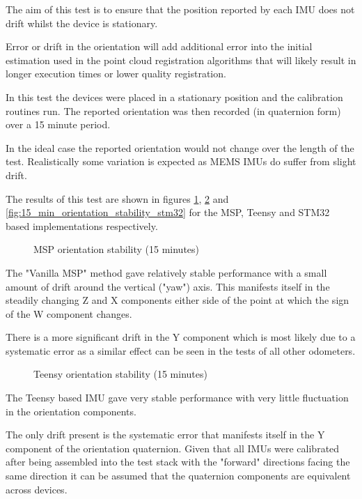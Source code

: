 \documentclass{entcs}
\begin{document}
The aim of this test is to ensure that the position reported by each IMU does
not drift whilst the device is stationary.

Error or drift in the orientation will add additional error into the initial
estimation used in the point cloud registration algorithms that will likely
result in longer execution times or lower quality registration.

In this test the devices were placed in a stationary position and the
calibration routines run. The reported orientation was then recorded (in
quaternion form) over a 15 minute period.

In the ideal case the reported orientation would not change over the length of
the test. Realistically some variation is expected as MEMS IMUs do suffer from
slight drift.

The results of this test are shown in figures
\ref{fig:15_min_orientation_stability_msp},
\ref{fig:15_min_orientation_stability_teensy} and
\ref{fig:15_min_orientation_stability_stm32} for the MSP, Teensy and STM32 based
implementations respectively.

\begin{figure}[h!]
  \centering
  \scalebox{0.7}{}
  \caption{MSP orientation stability (15 minutes)}
  \label{fig:15_min_orientation_stability_msp}
\end{figure}

The "Vanilla MSP" method gave relatively stable performance with a small amount
of drift around the vertical ("yaw") axis. This manifests itself in the steadily
changing Z and X components either side of the point at which the sign of the W
component changes.

There is a more significant drift in the Y component which is most likely due to
a systematic error as a similar effect can be seen in the tests of all other
odometers.

\begin{figure}[h!]
  \centering
  \scalebox{0.7}{}
  \caption{Teensy orientation stability (15 minutes)}
  \label{fig:15_min_orientation_stability_teensy}
\end{figure}

The Teensy based IMU gave very stable performance with very little fluctuation
in the orientation components.

The only drift present is the systematic error that manifests itself in the Y
component of the orientation quaternion. Given that all IMUs were calibrated
after being assembled into the test stack with the "forward" directions facing
the same direction it can be assumed that the quaternion components are
equivalent across devices.
\end{document}
